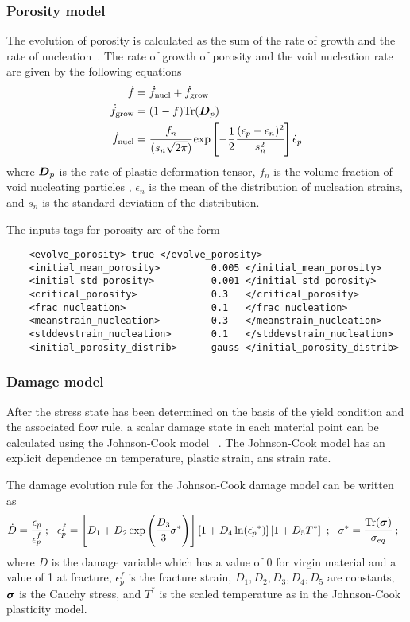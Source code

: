   \subsubsection{Porosity model}
  The evolution of porosity is calculated as the sum of the rate of growth 
  and the rate of nucleation~\cite{Ramaswamy98a}.  The rate of growth of
  porosity and the void nucleation rate are given by the following equations
  ~\cite{Chu80}
  \begin{align}
    \dot{f} &= \dot{f}_{\text{nucl}} + \dot{f}_{\text{grow}} \\
    \dot{f}_{\text{grow}} & = (1-f) \text{Tr}(\BD_p) \\
    \dot{f}_{\text{nucl}} & = \cfrac{f_n}{(s_n \sqrt{2\pi})}
            \exp\left[-\Half \cfrac{(\epsilon_p - \epsilon_n)^2}{s_n^2}\right]
            \dot{\epsilon}_p
  \end{align}
  where $\BD_p$ is the rate of plastic deformation tensor, $f_n$ is the volume 
  fraction of void nucleating particles , $\epsilon_n$ is the mean of the 
  distribution of nucleation strains, and $s_n$ is the standard 
  deviation of the distribution.

  The inputs tags for porosity are of the form
  \begin{verbatim}
    <evolve_porosity> true </evolve_porosity>
    <initial_mean_porosity>         0.005 </initial_mean_porosity>
    <initial_std_porosity>          0.001 </initial_std_porosity>
    <critical_porosity>             0.3   </critical_porosity>
    <frac_nucleation>               0.1   </frac_nucleation>
    <meanstrain_nucleation>         0.3   </meanstrain_nucleation>
    <stddevstrain_nucleation>       0.1   </stddevstrain_nucleation>
    <initial_porosity_distrib>      gauss </initial_porosity_distrib>
  \end{verbatim}

  \subsubsection{Damage model}
  After the stress state has been determined on the basis of the yield condition
  and the associated flow rule, a scalar damage state in each material point can
  be calculated using the Johnson-Cook model ~\cite{Johnson85}.  
  The Johnson-Cook model has an explicit dependence on temperature, plastic
  strain, ans strain rate.

  The damage evolution rule for the Johnson-Cook damage model can be written as
  \begin{equation}
    \dot{D} = \cfrac{\dot{\epsilon_p}}{\epsilon_p^f} ~;~~
    \epsilon_p^f = 
      \left[D_1 + D_2 \exp \left(\cfrac{D_3}{3} \sigma^*\right)\right]
      \left[1+ D_4 \ln(\dot{\epsilon_p}^*)\right]
      \left[1+D_5 T^*\right]~;~~
    \sigma^*= \cfrac{\text{Tr}(\Bsig)}{\sigma_{eq}}~;~~
  \end{equation}
  where $D$ is the damage variable which has a value of 0 for virgin material
  and a value of 1 at fracture, $\epsilon_p^f$ is the fracture strain, 
  $D_1, D_2, D_3, D_4, D_5$ are constants, $\Bsig$ is the Cauchy stress, and
  $T^*$ is the scaled temperature as in the Johnson-Cook plasticity model.

